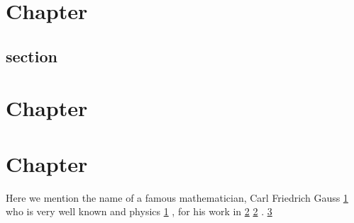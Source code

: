 \documentclass[12pt]{article}
\begin{document}
\section{Chapter}
\label{Chp1}
\printindex[ch1]
\lipsum[1-5]

\subsection{section}
\lipsum[15]

\section{Chapter}
\label{Chp2}
\printindex[ch2]

\lipsum[4-7]

\section{Chapter}
\label{Chp3}
\printindex[ch3]
\lipsum[1-8]
Here we mention the name of a famous mathematician, Carl Friedrich 
Gauss \ref{Chp1}  who is very well known
and physics \ref{Chp1} ,
for his work in \ref{Chp2}  
\ref{Chp2} . \ref{Chp3} 
\end{document}
